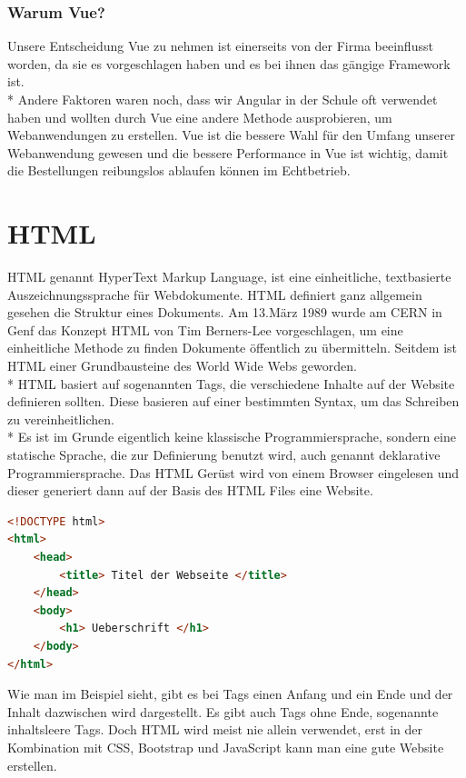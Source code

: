 \subsubsection{Warum Vue?}
Unsere Entscheidung Vue zu nehmen ist einerseits von der Firma beeinflusst worden, da sie es vorgeschlagen haben und es bei ihnen das gängige Framework ist.\\*
Andere Faktoren waren noch, dass wir Angular in der Schule oft verwendet haben und wollten durch Vue eine andere Methode ausprobieren, um Webanwendungen zu erstellen.
Vue ist die bessere Wahl für den Umfang unserer Webanwendung gewesen und die bessere Performance in Vue ist wichtig, damit die Bestellungen reibungslos ablaufen können im Echtbetrieb.

\section{HTML}
\author{Benjamin Besic}
HTML genannt HyperText Markup Language, ist eine einheitliche, textbasierte Auszeichnungssprache für Webdokumente. HTML definiert ganz allgemein gesehen die Struktur eines Dokuments. 
Am 13.März 1989 wurde am CERN in Genf das Konzept HTML von Tim Berners-Lee vorgeschlagen, um eine einheitliche Methode zu finden Dokumente öffentlich zu übermitteln. Seitdem ist HTML  einer Grundbausteine des World Wide Webs geworden. \\*
HTML basiert auf sogenannten Tags, die verschiedene Inhalte auf der Website definieren sollten. Diese basieren auf einer bestimmten Syntax, um das Schreiben zu vereinheitlichen. \\*
Es ist im Grunde eigentlich keine klassische Programmiersprache, sondern eine statische Sprache, die zur Definierung benutzt wird, auch genannt deklarative Programmiersprache.  
Das HTML Gerüst wird von einem Browser eingelesen und dieser generiert dann auf der Basis des HTML Files eine Website. \cite{HTMLTut} \cite{HTMLSeoKueche}

\begin{lstlisting}[language=HTML,caption=HTML File Grundgerüst,label=lst:impl:foo]
<!DOCTYPE html>
<html>
    <head>
        <title> Titel der Webseite </title>
    </head>
    <body>
        <h1> Ueberschrift </h1>
    </body>
</html>
\end{lstlisting}

Wie man im Beispiel sieht, gibt es bei Tags einen Anfang und ein Ende und der Inhalt dazwischen wird dargestellt.
Es gibt auch Tags ohne Ende, sogenannte inhaltsleere Tags.
Doch HTML wird meist nie allein verwendet, erst in der Kombination mit CSS, Bootstrap und JavaScript kann man eine gute Website erstellen.


